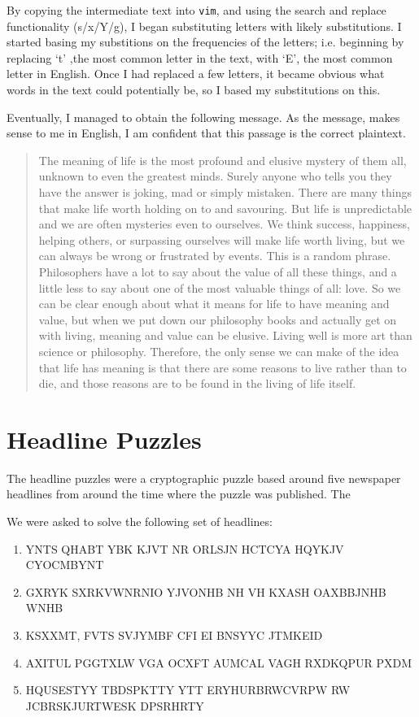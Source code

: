 \documentclass[11pt,a4paper,twoside]{article}
\begin{document}
By copying the intermediate text into {\tt vim}, and using the search and
replace functionality (s/x/Y/g), I began substituting letters with likely
substitutions. I started basing my substitions on the frequencies of the
letters; i.e. beginning by replacing `t' ,the most common letter in the text,
with `E', the most common letter in English. Once I had replaced a few letters,
it became obvious what words in the text could potentially be, so I based my
substitutions on this. 

Eventually, I managed to obtain the following message. As the message, makes
sense to me in English, I am confident that this passage is the correct
plaintext. 

\begin{quote}
\small
\raggedright
The meaning of life is the most profound and elusive mystery of them all,
unknown to even the greatest minds. Surely anyone who tells you they have the
answer is joking, mad or simply mistaken.  There are many things that make life
worth holding on to and savouring. But life is unpredictable and we are often
mysteries even to ourselves. We think success, happiness, helping others, or
surpassing ourselves will make life worth living, but we can always be wrong or
frustrated by events.  This is a random phrase.  Philosophers have a lot to say
about the value of all these things, and a little less to say about one of the
most valuable things of all: love. So we can be clear enough about what it
means for life to have meaning and value, but when we put down our philosophy
books and actually get on with living, meaning and value can be elusive. Living
well is more art than science or philosophy. Therefore,  the only sense we can
make of the idea that life has meaning is that there are some reasons to live
rather than to die, and those reasons are to be found in the living of life
itself.
\end{quote}

\vfill
\pagebreak
\section{Headline Puzzles}
The headline puzzles were a cryptographic puzzle based around five newspaper
headlines from around the time where the puzzle was published. The 

We were asked to solve the following set of headlines: 

\begin{enumerate}[noitemsep]
\item YNTS QHABT YBK KJVT NR ORLSJN HCTCYA HQYKJV CYOCMBYNT 
\item GXRYK SXRKVWNRNIO YJVONHB NH VH KXASH OAXBBJNHB WNHB 
\item KSXXMT, FVTS SVJYMBF CFI EI BNSYYC JTMKEID 
\item AXITUL PGGTXLW VGA OCXFT AUMCAL VAGH RXDKQPUR PXDM
\item HQUSESTYY TBDSPKTTY YTT ERYHURBRWCVRPW RW JCBRSKJURTWESK DPSRHRTY
\end{enumerate}
\end{document}
